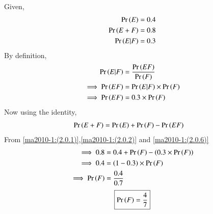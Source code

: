 %
Given,
\begin{align}
   \label{ma2010-1:(2.0.1)} \Pr\left(E\right) &= 0.4 \\
   \label{ma2010-1:(2.0.2)} \Pr\left(E+F\right) &= 0.8 \\
    \Pr\left(E|F\right) &= 0.3
\end{align}
By definition,
\begin{align}
    \Pr\left(E|F\right) &= \frac{\Pr\left(EF\right)}{\Pr\left(F\right)} \\
    \implies \Pr\left(EF\right) &= \Pr\left(E|F\right) \times \Pr\left(F\right) \\
    \label{ma2010-1:(2.0.6)}\implies \Pr\left(EF\right) &= 0.3 \times \Pr\left(F\right)
\end{align}
Now using the identity,
\begin{align}
    \Pr\left(E+F\right) &= \Pr\left(E\right) + \Pr\left(F\right) - \Pr\left(EF\right)
\end{align}
From \eqref{ma2010-1:(2.0.1)},\eqref{ma2010-1:(2.0.2)} and \eqref{ma2010-1:(2.0.6)}
\begin{align}
    \implies 0.8 &= 0.4 + \Pr\left(F\right) - \left(0.3 \times \Pr\left(F\right)\right) \\
    \implies 0.4 &= \left(1-0.3\right) \times \Pr\left(F\right) \\
    \implies \Pr\left(F\right) &= \frac{0.4}{0.7}
\end{align}
\begin{equation}
    \boxed{\Pr\left(F\right) = \frac{4}{7}}
\end{equation}